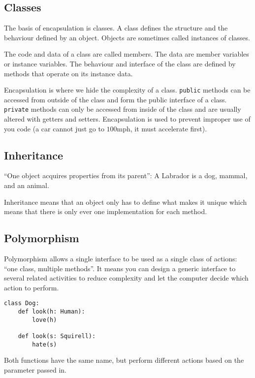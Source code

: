 \subsection{Classes}\label{sub:classes}

The basis of encapsulation is classes.
A class defines the structure and the behaviour defined by an object.
Objects are sometimes called instances of classes.

The code and data of a class are called members.
The data are member variables or instance variables.
The behaviour and interface of the class are defined by methods that operate on its instance data.

Encapsulation is where we hide the complexity of a class.
\texttt{public} methods can be accessed from outside of the class and form the public interface of a class.
\texttt{private} methods can only be accessed from inside of the class and are usually altered with getters and setters.
Encapsulation is used to prevent improper use of you code (a car cannot just go to \(100\)mph, it must accelerate first).

\subsection{Inheritance}\label{sub:inheritance}

``One object acquires properties from its parent'': A Labrador is a dog, mammal, and an animal.

Inheritance means that an object only has to define what makes it unique which means that there is only ever one implementation for each method.

\subsection{Polymorphism}\label{sub:polymorphism}

Polymorphism allows a single interface to be used as a single class of actions: ``one class, multiple methods''.
It means you can design a generic interface to several related activities to reduce complexity and let the computer decide which action to perform.
%
\begin{verbatim}
class Dog:
    def look(h: Human):
        love(h)

    def look(s: Squirell):
        hate(s)
\end{verbatim}
%
Both functions have the same name, but perform different actions based on the parameter passed in.
